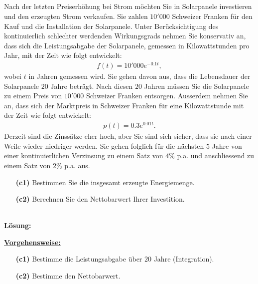 \newpage
\subsection*{}
Nach der letzten Preiserhöhung bei Strom möchten Sie in Solarpanele investieren und den erzeugten Strom verkaufen. 
Sie zahlen $10'000$ Schweizer Franken für den Kauf und die
Installation der Solarpanele.
Unter Berücksichtigung des kontinuierlich schlechter werdenden Wirkungsgrads nehmen Sie konservativ an, dass sich die Leistungsabgabe der Solarpanele, gemessen in Kilowattstunden pro Jahr, mit der Zeit wie folgt entwickelt:
\begin{align*}
	f(t) = 10'000 e^{-0.1 t},
\end{align*}
wobei $t$ in Jahren gemessen wird.
Sie gehen davon aus, dass die Lebensdauer der Solarpanele $20$ Jahre beträgt. Nach diesen $20$ Jahren müssen Sie die Solarpanele zu einem Preis von $10'000$ Schweizer Franken entsorgen. Ausserdem nehmen Sie an, dass sich der Marktpreis in
Schweizer Franken für eine Kilowattstunde mit der Zeit wie folgt entwickelt:
\begin{align*}
	p(t)
	=
	0.3 e^{0.01t}.
\end{align*}
Derzeit sind die Zinssätze eher hoch, aber Sie sind sich sicher, dass sie nach einer Weile wieder niedriger werden. Sie gehen folglich für die nächsten $5$ Jahre von einer kontinuierlichen
Verzinsung zu einem Satz von $4 \%$ p.a. und anschliessend zu einem Satz von $2\%$ p.a. aus.

\begin{enumerate}
	\item[\textbf{(c1)}] 
	Bestimmen Sie die insgesamt erzeugte Energiemenge.
	\item[\textbf{(c2)}]
	Berechnen Sie den Nettobarwert Ihrer Investition.
\end{enumerate}
\ \\
\textbf{Lösung:}
\begin{mdframed}
\underline{\textbf{Vorgehensweise:}}
\begin{enumerate}
\item[\textbf{(c1)}] Bestimme die Leistungsabgabe über $20$ Jahre (Integration).
\item[\textbf{(c2)}] Bestimme den Nettobarwert.
\end{enumerate}
\end{mdframed}

